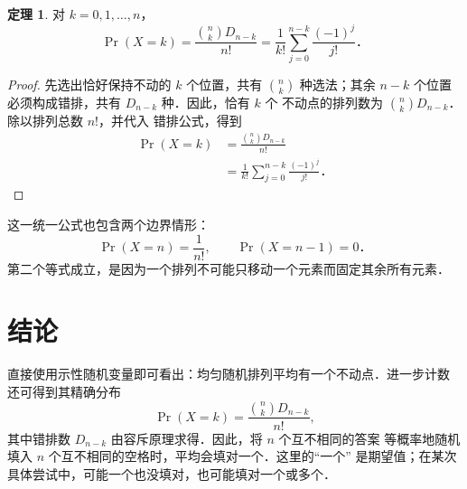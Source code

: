 \documentclass[UTF8,11pt,a4paper,fontset=none]{ctexart}
\theoremstyle{definition}
\newtheorem{theorem}{定理}
\begin{document}
\begin{theorem}
对 \(k=0,1,\ldots,n\)，
\[
  \Pr(X=k)
    =\frac{\binom{n}{k}D_{n-k}}{n!}
    =\frac{1}{k!}\sum_{j=0}^{n-k}\frac{(-1)^j}{j!}\text{．}
\]
\end{theorem}

\begin{proof}
先选出恰好保持不动的 \(k\) 个位置，共有 \(\binom{n}{k}\) 种选法；其余
\(n-k\) 个位置必须构成错排，共有 \(D_{n-k}\) 种．因此，恰有 \(k\) 个
不动点的排列数为 \(\binom{n}{k}D_{n-k}\)．除以排列总数 \(n!\)，并代入
错排公式，得到
\begin{align*}
  \Pr(X=k)
    &=\frac{\binom{n}{k}D_{n-k}}{n!}\\
    &=\frac{1}{k!}
      \sum_{j=0}^{n-k}\frac{(-1)^j}{j!}\text{．}
\end{align*}
\end{proof}

这一统一公式也包含两个边界情形：
\[
  \Pr(X=n)=\frac{1}{n!},
  \qquad
  \Pr(X=n-1)=0\text{．}
\]
第二个等式成立，是因为一个排列不可能只移动一个元素而固定其余所有元素．

\section{结论}

直接使用示性随机变量即可看出：均匀随机排列平均有一个不动点．进一步计数
还可得到其精确分布
\[
  \Pr(X=k)=\frac{\binom{n}{k}D_{n-k}}{n!},
\]
其中错排数 \(D_{n-k}\) 由容斥原理求得．因此，将 \(n\) 个互不相同的答案
等概率地随机填入 \(n\) 个互不相同的空格时，平均会填对一个．这里的“一个”
是期望值；在某次具体尝试中，可能一个也没填对，也可能填对一个或多个．
\end{document}
